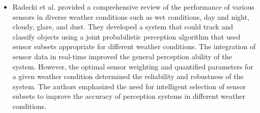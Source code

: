 \documentclass[rnd]{mas_proposal}
\begin{document}
\begin{itemize}
      
      \item Radecki et al. \cite{radecki2016all} provided a comprehensive review of the performance of various sensors in diverse weather conditions such as wet conditions, day and night, cloudy, glare, and dust. They developed a system that could track and classify objects using a joint probabilistic perception algorithm that used sensor subsets appropriate for different weather conditions. The integration of sensor data in real-time improved the general perception ability of the system. However, the optimal sensor weighting and quantified parameters for a given weather condition determined the reliability and robustness of the system. The authors emphasized the need for intelligent selection of sensor subsets to improve the accuracy of perception systems in different weather conditions.
      

\end{itemize}
\end{document}
